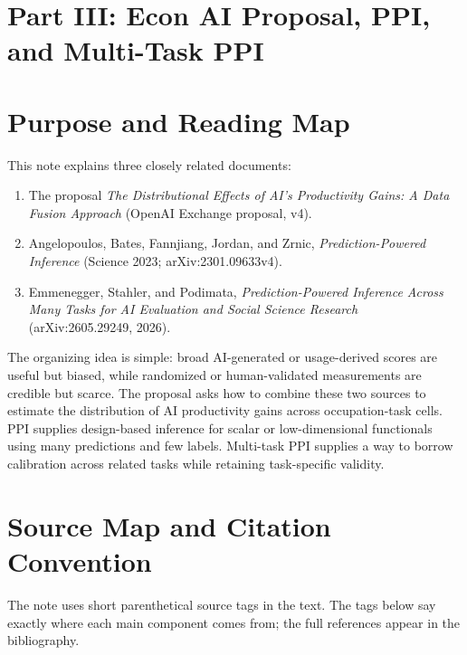 \documentclass[11pt]{article}
\begin{document}
\clearpage
\section*{Part III: Econ AI Proposal, PPI, and Multi-Task PPI}

\section*{Purpose and Reading Map}

This note explains three closely related documents:
\begin{enumerate}[leftmargin=*]
  \item The proposal \emph{The Distributional Effects of AI's Productivity Gains: A Data Fusion Approach} (OpenAI Exchange proposal, v4).
  \item Angelopoulos, Bates, Fannjiang, Jordan, and Zrnic, \emph{Prediction-Powered Inference} (Science 2023; arXiv:2301.09633v4).
  \item Emmenegger, Stahler, and Podimata, \emph{Prediction-Powered Inference Across Many Tasks for AI Evaluation and Social Science Research} (arXiv:2605.29249, 2026).
\end{enumerate}

The organizing idea is simple: broad AI-generated or usage-derived scores are useful but biased, while randomized or human-validated measurements are credible but scarce. The proposal asks how to combine these two sources to estimate the distribution of AI productivity gains across occupation-task cells. PPI supplies design-based inference for scalar or low-dimensional functionals using many predictions and few labels. Multi-task PPI supplies a way to borrow calibration across related tasks while retaining task-specific validity.

\section*{Source Map and Citation Convention}

The note uses short parenthetical source tags in the text. The tags below say exactly where each main component comes from; the full references appear in the bibliography.
\end{document}
